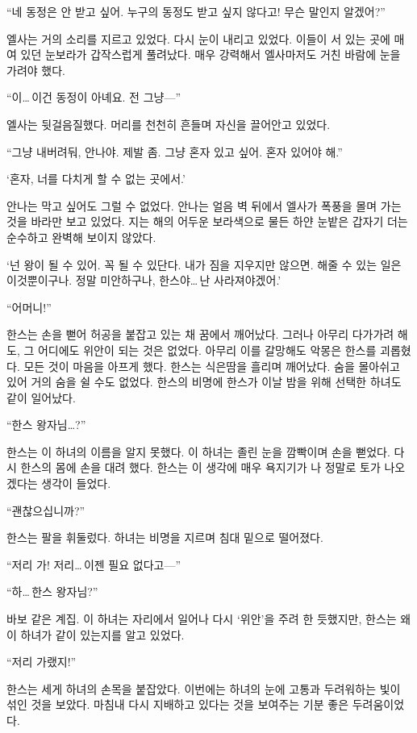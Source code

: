 ``네 동정은 안 받고 싶어. 누구의 동정도 받고 싶지 않다고! 무슨 말인지 알겠어?''

엘사는 거의 소리를 지르고 있었다. 다시 눈이 내리고 있었다. 이들이 서 있는 곳에 매여 있던 눈보라가 갑작스럽게 풀려났다. 매우 강력해서 엘사마저도 거친 바람에 눈을 가려야 했다.

``이\ldots\,이건 동정이 아녜요. 전 그냥—''

엘사는 뒷걸음질했다. 머리를 천천히 흔들며 자신을 끌어안고 있었다.

``그냥 내버려둬, 안나야. 제발 좀. 그냥 혼자 있고 싶어. 혼자 있어야 해.''

`혼자, 너를 다치게 할 수 없는 곳에서.'

안나는 막고 싶어도 그럴 수 없었다. 안나는 얼음 벽 뒤에서 엘사가 폭풍을 몰며 가는 것을 바라만 보고 있었다. 지는 해의 어두운 보라색으로 물든 하얀 눈밭은 갑자기 더는 순수하고 완벽해 보이지 않았다.

\textbreak

\forceindent`넌 왕이 될 수 있어. 꼭 될 수 있단다. 내가 짐을 지우지만 않으면. 해줄 수 있는 일은 이것뿐이구나. 정말 미안하구나, 한스야\ldots\,난 사라져야겠어.'

``어머니!''

한스는 손을 뻗어 허공을 붙잡고 있는 채 꿈에서 깨어났다. 그러나 아무리 다가가려 해도, 그 어디에도 위안이 되는 것은 없었다. 아무리 이를 갈망해도 악몽은 한스를 괴롭혔다. 모든 것이 마음을 아프게 했다. 한스는 식은땀을 흘리며 깨어났다. 숨을 몰아쉬고 있어 거의 숨을 쉴 수도 없었다. 한스의 비명에 한스가 이날 밤을 위해 선택한 하녀도 같이 일어났다.

``한스 왕자님\ldots?''

한스는 이 하녀의 이름을 알지 못했다. 이 하녀는 졸린 눈을 깜빡이며 손을 뻗었다. 다시 한스의 몸에 손을 대려 했다. 한스는 이 생각에 매우 욕지기가 나 정말로 토가 나오겠다는 생각이 들었다.

``괜찮으십니까?''

한스는 팔을 휘둘렀다. 하녀는 비명을 지르며 침대 밑으로 떨어졌다.

``저리 가! 저리\ldots\,이젠 필요 없다고—''

``하\ldots\,한스 왕자님?''

바보 같은 계집. 이 하녀는 자리에서 일어나 다시 `위안'을 주려 한 듯했지만, 한스는 왜 이 하녀가 같이 있는지를 알고 있었다.

``저리 가랬지!''

한스는 세게 하녀의 손목을 붙잡았다. 이번에는 하녀의 눈에 고통과 두려워하는 빛이 섞인 것을 보았다. 마침내 다시 지배하고 있다는 것을 보여주는 기분 좋은 두려움이었다.

